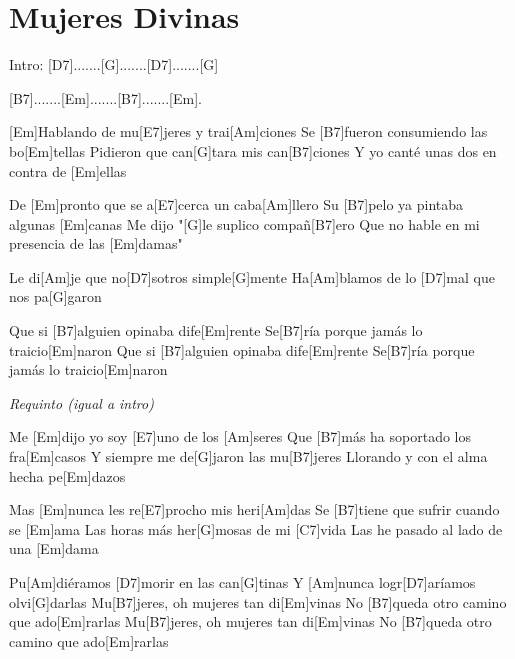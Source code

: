 
\section{Mujeres Divinas}

\noindent
\chordC
\chordAm
\chordDm
\chordGs

\vspace{1cm}

\begin{guitar}
	\begin{multicols}{2}

		Intro: [D7].......[G].......[D7].......[G]

		\hspace{1cm}[B7].......[Em].......[B7].......[Em].

		[Em]Hablando de mu[E7]jeres y trai[Am]ciones
		Se [B7]fueron consumiendo las bo[Em]tellas
		Pidieron que can[G]tara mis can[B7]ciones
		Y yo canté unas dos en contra de [Em]ellas


		De [Em]pronto que se a[E7]cerca un caba[Am]llero
		Su [B7]pelo ya pintaba algunas [Em]canas
		Me dijo "[G]le suplico compañ[B7]ero
		Que no hable en mi presencia de las [Em]damas"


		Le di[Am]je que no[D7]sotros simple[G]mente
		Ha[Am]blamos de lo [D7]mal que nos pa[G]garon

		Que si [B7]alguien opinaba dife[Em]rente
		Se[B7]ría porque jamás lo traicio[Em]naron
		Que si [B7]alguien opinaba dife[Em]rente
		Se[B7]ría porque jamás lo traicio[Em]naron


		\textit{Requinto (igual a intro)}


		Me [Em]dijo yo soy [E7]uno de los [Am]seres
		Que [B7]más ha soportado los fra[Em]casos
		Y siempre me de[G]jaron las mu[B7]jeres
		Llorando y con el alma hecha pe[Em]dazos


		Mas [Em]nunca les re[E7]procho mis heri[Am]das
		Se [B7]tiene que sufrir cuando se [Em]ama
		Las horas más her[G]mosas de mi [C7]vida
		Las he pasado al lado de una [Em]dama



		Pu[Am]diéramos [D7]morir en las can[G]tinas
		Y [Am]nunca logr[D7]aríamos olvi[G]darlas
		Mu[B7]jeres, oh mujeres tan di[Em]vinas
		No [B7]queda otro camino que ado[Em]rarlas
		Mu[B7]jeres, oh mujeres tan di[Em]vinas
		No [B7]queda otro camino que ado[Em]rarlas
	\end{multicols}
\end{guitar}
